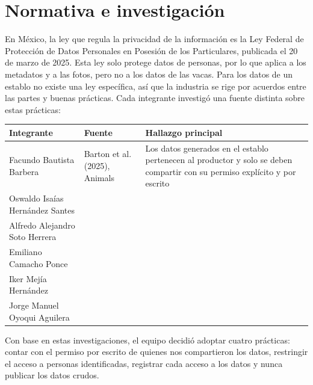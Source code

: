 \section{Normativa e investigación}

En México, la ley que regula la privacidad de la información es la Ley Federal de Protección de Datos Personales en Posesión de los Particulares, publicada el 20 de marzo de 2025. Esta ley solo protege datos de personas, por lo que aplica a los metadatos y a las fotos, pero no a los datos de las vacas. Para los datos de un establo no existe una ley específica, así que la industria se rige por acuerdos entre las partes y buenas prácticas. Cada integrante investigó una fuente distinta sobre estas prácticas:

\begin{table}[htbp]
  \centering
  \small
  \begin{tabularx}{\textwidth}{>{\raggedright\arraybackslash}p{}>{\raggedright\arraybackslash}p{}X}
    \toprule
    Integrante & Fuente & Hallazgo principal \\
    \midrule
    Facundo Bautista Barbera & Barton et al. (2025), Animals & Los datos generados en el establo pertenecen al productor y solo se deben compartir con su permiso explícito y por escrito \\
    Oswaldo Isaías Hernández Santes & & \\
    Alfredo Alejandro Soto Herrera & & \\
    Emiliano Camacho Ponce & & \\
    Iker Mejía Hernández & & \\
    Jorge Manuel Oyoqui Aguilera & & \\
    \bottomrule
  \end{tabularx}
\end{table}

Con base en estas investigaciones, el equipo decidió adoptar cuatro prácticas: contar con el permiso por escrito de quienes nos compartieron los datos, restringir el acceso a personas identificadas, registrar cada acceso a los datos y nunca publicar los datos crudos.
